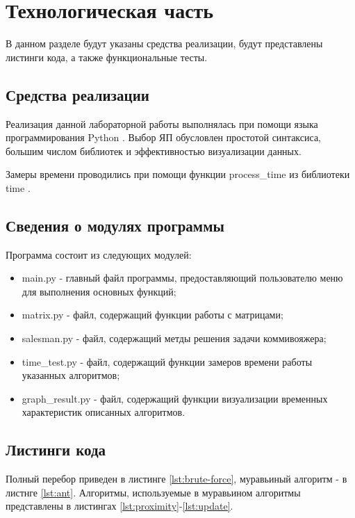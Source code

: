 \chapter{Технологическая часть}

В данном разделе будут указаны средства реализации, будут представлены листинги кода, а также функциональные тесты.

\section{Средства реализации}

Реализация данной лабораторной работы выполнялась при помощи языка программирования Python \cite{python}. Выбор ЯП обусловлен простотой синтаксиса, большим числом библиотек и эффективностью визуализации данных.

Замеры времени проводились при помощи функции process\_time из библиотеки time \cite{python-time}.

\section{Сведения о модулях программы}

Программа состоит из следующих модулей:

\begin{itemize}
	\item main.py - главный файл программы, предоставляющий пользователю меню для выполнения основных функций;
	\item matrix.py - файл, содержащий функции работы с матрицами;
	\item salesman.py - файл, содержащий метды решения задачи коммивояжера;
	\item time\_test.py - файл, содержащий функции замеров времени работы указанных алгоритмов;
	\item graph\_result.py - файл, содержащий функции визуализации временных характеристик описанных алгоритмов.
\end{itemize}

\section{Листинги кода}

Полный перебор приведен в листинге \ref{lst:brute-force}, муравьиный алгоритм - в листнге \ref{lst:ant}. Алгоритмы, используемые в муравьином алгоритмы представлены в листингах \ref{lst:proximity}-\ref{lst:update}.

